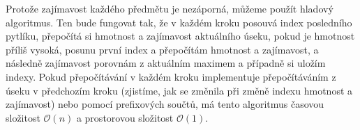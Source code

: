 \documentclass{fkssolpub}
\author{Ondřej Sedláček}
\begin{document}
Protože zajímavost každého předmětu je nezáporná, můžeme použít hladový
algoritmus. Ten bude fungovat tak, že v každém
kroku posouvá index posledního pytlíku, přepočítá si hmotnost a zajímavost
aktuálního úseku, pokud je hmotnost příliš vysoká, posunu první index a
přepočítám hmotnost a zajímavost, a následně zajímavost porovnám z aktuálním
maximem a případně si uložím indexy. Pokud přepočítávání v každém kroku
implementuje přepočítáváním z úseku v předchozím kroku (zjistíme, jak se změnila
při změně indexu hmotnost a zajímavost) nebo pomocí prefixových součtů, má
tento algoritmus časovou složitost $\mathcal{O}(n)$ a prostorovou složitost
$\mathcal{O}(1)$.
\end{document}

